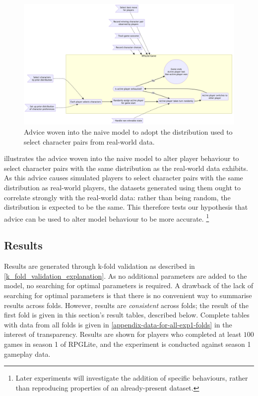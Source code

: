 \begin{figure}[h]
  \centering
  \includegraphics[width=\columnwidth]{70_generality_of_aspects/diagrams/exp2_prior_distribution_model.png}
  \caption{Advice woven into the naive model to adopt the distribution used to select character pairs from real-world data.}
  \label{fig:exp1_prior_distribution_model}
\end{figure}

 illustrates the advice woven into the
naive model to alter player behaviour to select character pairs with the same
distribution as the real-world data exhibits. As this advice causes simulated
players to select character pairs with the same distribution as real-world
players, the datasets generated using them ought to correlate strongly with the
real-world data: rather than being random, the distribution is expected to be
the same. This therefore tests our hypothesis that advice can be used to alter
model behaviour to be more accurate.
\footnote{
  Later experiments will investigate the addition of specific behaviours, rather
  than reproducing properties of an already-present dataset.
}


\subsection{Results}

Results are generated through k-fold validation as described in
\cref{k_fold_validation_explanation}. As no additional parameters are added to
the model, no searching for optimal parameters is required. A drawback of the
lack of searching for optimal parameters is that there is no convenient way to
summarise results across folds. However, results are \emph{consistent} across
folds; the result of the first fold is given in this section's result tables,
described below. Complete tables with data from all folds is given in
\cref{appendix-data-for-all-exp1-folds} in the interest of transparency. Results
are shown for players who completed at least $100$ games in season 1 of RPGLite,
and the experiment is conducted against season 1 gameplay data.

